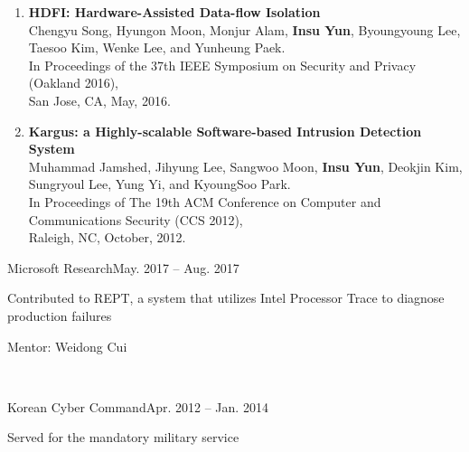 \documentclass[11pt,letterpaper]{article}
\begin{document}
\begin{enumerate}
{     \textbf{$\bullet$ Nominated as a finalist in CSAW Best Applied Research Paper Award 2016.}
  }
  \item \textbf{HDFI: Hardware-Assisted Data-flow Isolation} \\
  {\footnotesize
    Chengyu Song, Hyungon Moon, Monjur Alam, \textbf{Insu Yun}, Byoungyoung Lee,
    Taesoo Kim, Wenke Lee, and Yunheung Paek. \\
    In Proceedings of the 37th IEEE Symposium on Security and Privacy (Oakland 2016), \\
    San Jose, CA, May, 2016.
  }
  \item \textbf{Kargus: a Highly-scalable Software-based Intrusion Detection System} \\
  {\footnotesize
    Muhammad Jamshed, Jihyung Lee, Sangwoo Moon, \textbf{Insu Yun}, Deokjin
    Kim, Sungryoul Lee, Yung Yi, and KyoungSoo Park. \\
    In Proceedings of The 19th ACM Conference on Computer and Communications Security (CCS 2012), \\
    Raleigh, NC, October, 2012.
  }
\end{enumerate}

%
%

\begin{envtime}{Microsoft Research}{May. 2017 -- Aug. 2017}
\item Contributed to REPT, a system that utilizes Intel Processor Trace to diagnose production failures
  \item Mentor:  Weidong Cui
\end{envtime}
 \\
\begin{envtime}{Korean Cyber Command}{Apr. 2012 -- Jan. 2014}
  \item Served for the mandatory military service
\end{envtime}
\end{document}
